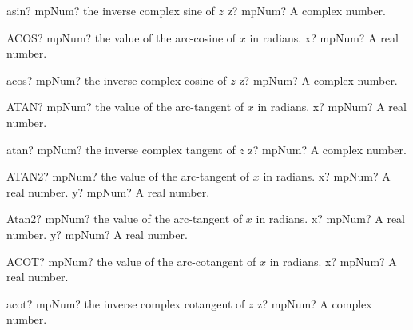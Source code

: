 \documentclass[12pt,a4paper,openany]{book}
\begin{document}
\begin{mpFunctionsExtract}
\mpFunctionOne
{asin? mpNum? the inverse complex sine of $z$}
{z? mpNum? A complex number.}
\end{mpFunctionsExtract}

\begin{mpFunctionsExtract}
\mpWorksheetFunctionOneNotImplemented
{ACOS? mpNum? the value of the arc-cosine of $x$ in radians.}
{x? mpNum? A real number.}
\end{mpFunctionsExtract}

\begin{mpFunctionsExtract}
\mpFunctionOne
{acos? mpNum? the inverse complex cosine of $z$}
{z? mpNum? A complex number.}
\end{mpFunctionsExtract}

\begin{mpFunctionsExtract}
\mpWorksheetFunctionOneNotImplemented
{ATAN? mpNum? the value of the arc-tangent of $x$ in radians.}
{x? mpNum? A real number.}
\end{mpFunctionsExtract}

\begin{mpFunctionsExtract}
\mpFunctionOne
{atan? mpNum? the inverse complex tangent of $z$}
{z? mpNum? A complex number.}
\end{mpFunctionsExtract}

\begin{mpFunctionsExtract}
\mpWorksheetFunctionTwoNotImplemented
{ATAN2? mpNum? the value of the arc-tangent of $x$ in radians.}
{x? mpNum? A real number.}
{y? mpNum? A real number.}
\end{mpFunctionsExtract}

\begin{mpFunctionsExtract}
\mpFunctionTwo
{Atan2? mpNum? the value of the arc-tangent of $x$ in radians.}
{x? mpNum? A real number.}
{y? mpNum? A real number.}
\end{mpFunctionsExtract}

\begin{mpFunctionsExtract}
\mpWorksheetFunctionOneNotImplemented
{ACOT? mpNum? the value of the arc-cotangent of $x$ in radians.}
{x? mpNum? A real number.}
\end{mpFunctionsExtract}

\begin{mpFunctionsExtract}
\mpFunctionOne
{acot? mpNum? the inverse complex cotangent of $z$}
{z? mpNum? A complex number.}
\end{mpFunctionsExtract}
\end{document}
